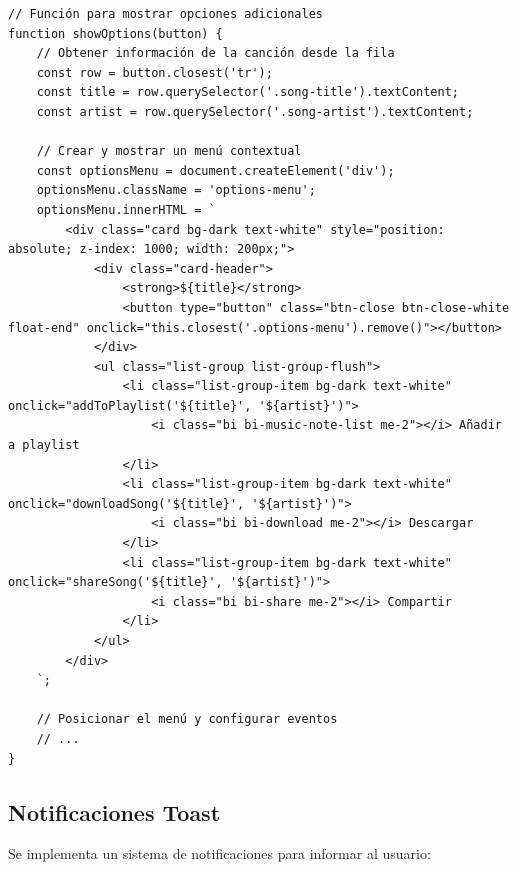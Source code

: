 \documentclass[a4paper,12pt]{article}
\begin{document}
\begin{verbatim}
// Función para mostrar opciones adicionales
function showOptions(button) {
    // Obtener información de la canción desde la fila
    const row = button.closest('tr');
    const title = row.querySelector('.song-title').textContent;
    const artist = row.querySelector('.song-artist').textContent;
    
    // Crear y mostrar un menú contextual
    const optionsMenu = document.createElement('div');
    optionsMenu.className = 'options-menu';
    optionsMenu.innerHTML = `
        <div class="card bg-dark text-white" style="position: absolute; z-index: 1000; width: 200px;">
            <div class="card-header">
                <strong>${title}</strong>
                <button type="button" class="btn-close btn-close-white float-end" onclick="this.closest('.options-menu').remove()"></button>
            </div>
            <ul class="list-group list-group-flush">
                <li class="list-group-item bg-dark text-white" onclick="addToPlaylist('${title}', '${artist}')">
                    <i class="bi bi-music-note-list me-2"></i> Añadir a playlist
                </li>
                <li class="list-group-item bg-dark text-white" onclick="downloadSong('${title}', '${artist}')">
                    <i class="bi bi-download me-2"></i> Descargar
                </li>
                <li class="list-group-item bg-dark text-white" onclick="shareSong('${title}', '${artist}')">
                    <i class="bi bi-share me-2"></i> Compartir
                </li>
            </ul>
        </div>
    `;
    
    // Posicionar el menú y configurar eventos
    // ...
}
\end{verbatim}

\subsection{Notificaciones Toast}
Se implementa un sistema de notificaciones para informar al usuario:
\end{document}
